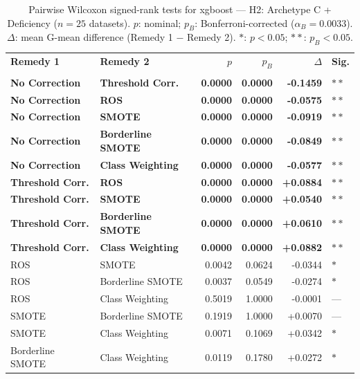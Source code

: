 \begin{table}[ht]
\centering
\scriptsize
\caption{Pairwise Wilcoxon signed-rank tests for xgboost --- H2: Archetype C + Deficiency ($n=25$ datasets). $p$: nominal; $p_B$: Bonferroni-corrected ($\alpha_B=0.0033$). $\Delta$: mean G-mean difference (Remedy 1 $-$ Remedy 2). $\ast$: $p<0.05$; $\ast\ast$: $p_B<0.05$.}
\label{tab:wilcoxon_xgboost_h2}
\begin{tabular}{llrrrl}
\toprule
\textbf{Remedy 1} & \textbf{Remedy 2} & \textbf{$p$} & \textbf{$p_B$} & \textbf{$\Delta$} &  \textbf{Sig.} \\\\
\midrule
    \textbf{No Correction} & \textbf{Threshold Corr.} & \textbf{0.0000} & \textbf{0.0000} & \textbf{-0.1459} & $\ast\ast$ \\
    \textbf{No Correction} & \textbf{ROS} & \textbf{0.0000} & \textbf{0.0000} & \textbf{-0.0575} & $\ast\ast$ \\
    \textbf{No Correction} & \textbf{SMOTE} & \textbf{0.0000} & \textbf{0.0000} & \textbf{-0.0919} & $\ast\ast$ \\
    \textbf{No Correction} & \textbf{Borderline SMOTE} & \textbf{0.0000} & \textbf{0.0000} & \textbf{-0.0849} & $\ast\ast$ \\
    \textbf{No Correction} & \textbf{Class Weighting} & \textbf{0.0000} & \textbf{0.0000} & \textbf{-0.0577} & $\ast\ast$ \\
    \textbf{Threshold Corr.} & \textbf{ROS} & \textbf{0.0000} & \textbf{0.0000} & \textbf{+0.0884} & $\ast\ast$ \\
    \textbf{Threshold Corr.} & \textbf{SMOTE} & \textbf{0.0000} & \textbf{0.0000} & \textbf{+0.0540} & $\ast\ast$ \\
    \textbf{Threshold Corr.} & \textbf{Borderline SMOTE} & \textbf{0.0000} & \textbf{0.0000} & \textbf{+0.0610} & $\ast\ast$ \\
    \textbf{Threshold Corr.} & \textbf{Class Weighting} & \textbf{0.0000} & \textbf{0.0000} & \textbf{+0.0882} & $\ast\ast$ \\
    ROS & SMOTE & 0.0042 & 0.0624 & -0.0344 & $\ast$ \\
    ROS & Borderline SMOTE & 0.0037 & 0.0549 & -0.0274 & $\ast$ \\
    ROS & Class Weighting & 0.5019 & 1.0000 & -0.0001 & --- \\
    SMOTE & Borderline SMOTE & 0.1919 & 1.0000 & +0.0070 & --- \\
    SMOTE & Class Weighting & 0.0071 & 0.1069 & +0.0342 & $\ast$ \\
    Borderline SMOTE & Class Weighting & 0.0119 & 0.1780 & +0.0272 & $\ast$ \\
\bottomrule
\end{tabular}
\end{table}